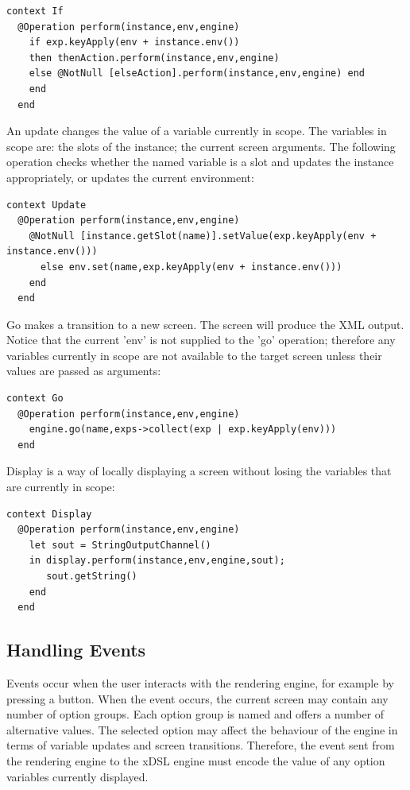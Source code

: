 \begin{lstlisting}
context If
  @Operation perform(instance,env,engine)
    if exp.keyApply(env + instance.env())
    then thenAction.perform(instance,env,engine)
    else @NotNull [elseAction].perform(instance,env,engine) end
    end
  end
\end{lstlisting}An update changes the value of a variable currently in scope. The
variables in scope are: the slots of the instance; the current screen
arguments. The following operation checks whether the named variable
is a slot and updates the instance appropriately, or updates the current
environment:

\begin{lstlisting}
context Update
  @Operation perform(instance,env,engine)
    @NotNull [instance.getSlot(name)].setValue(exp.keyApply(env + instance.env()))
      else env.set(name,exp.keyApply(env + instance.env()))
    end
  end
\end{lstlisting}Go makes a transition to a new screen. The screen will produce the
XML output. Notice that the current 'env' is not supplied to the 'go'
operation; therefore any variables currently in scope are not available
to the target screen unless their values are passed as arguments:

\begin{lstlisting}
context Go
  @Operation perform(instance,env,engine)
    engine.go(name,exps->collect(exp | exp.keyApply(env)))
  end
\end{lstlisting}Display is a way of locally displaying a screen without losing the
variables that are currently in scope:

\begin{lstlisting}
context Display
  @Operation perform(instance,env,engine)
    let sout = StringOutputChannel()
    in display.perform(instance,env,engine,sout);
       sout.getString()
    end
  end
\end{lstlisting}
\subsection{Handling Events}

Events occur when the user interacts with the rendering engine, for
example by pressing a button. When the event occurs, the current screen
may contain any number of option groups. Each option group is named
and offers a number of alternative values. The selected option may
affect the behaviour of the engine in terms of variable updates and
screen transitions. Therefore, the event sent from the rendering engine
to the xDSL engine must encode the value of any option variables currently
displayed.

